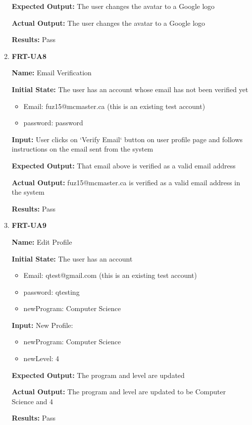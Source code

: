 \documentclass[12pt, titlepage]{article}
\begin{document}
\begin{enumerate}
\textbf{Expected Output:} The user changes the avatar to a Google logo

\textbf{Actual Output:} The user changes the avatar to a Google logo

\textbf{Results:} Pass

\item \textbf{FRT-UA8}

\textbf{Name:} Email Verification

\textbf{Initial State:} The user has an account whose email has not been verified yet
\begin{itemize}
\item Email: fuz15@mcmaster.ca (this is an existing test account)
\item password: password
\end{itemize}

\textbf{Input:} User clicks on `Verify Email` button on user profile page and follows instructions on the email sent from the system
					
\textbf{Expected Output:} That email above is verified as a valid email address

\textbf{Actual Output:} fuz15@mcmaster.ca is verified as a valid email address in the system

\textbf{Results:} Pass

\item \textbf{FRT-UA9}

\textbf{Name:} Edit Profile

\textbf{Initial State:} The user has an account 
\begin{itemize}
\item Email: qtest@gmail.com (this is an existing test account)
\item password: qtesting
\item newProgram: Computer Science
\end{itemize}

\textbf{Input:} New Profile:
\begin{itemize}
\item newProgram: Computer Science
\item newLevel: 4
\end{itemize}
					
\textbf{Expected Output:} The program and level are updated

\textbf{Actual Output:} The program and level are updated to be Computer Science and 4

\textbf{Results:} Pass
\end{enumerate}
\end{document}
